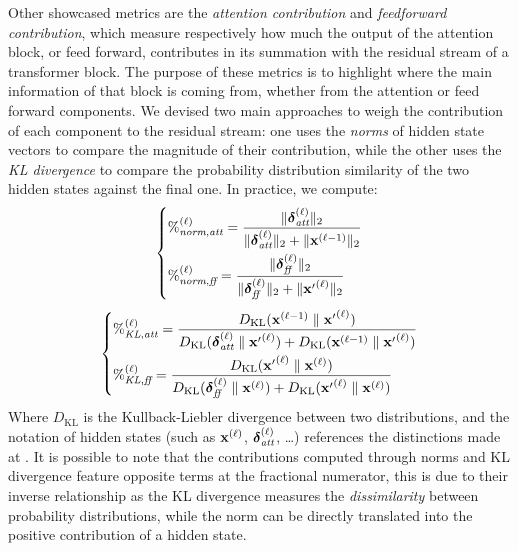 Other showcased metrics are the \emph{attention contribution} and \emph{feedforward contribution}, which measure respectively how much the output of the attention block, or feed forward, contributes in its summation with the residual stream of a transformer block.
The purpose of these metrics is to highlight where the main information of that block is coming from, whether from the attention or feed forward components.
We devised two main approaches to weigh the contribution of each component to the residual stream: one uses the \emph{norms} of hidden state vectors to compare the magnitude of their contribution, while the other uses the \emph{KL divergence} to compare the probability distribution similarity of the two hidden states against the final one.
In practice, we compute:
\begin{equation}
    \left\{
    \begin{aligned}
        &{\%}^{(\ell)}_{\textit{norm},\textit{att}} = \frac{\|\bm{\mathbf{\delta}}_\textit{att}^{(\ell)}\|_2}{\|\bm{\mathbf{\delta}}_\textit{att}^{(\ell)}\|_2 + \|\bm{\mathbf{x}}^{(\ell-1)}\|_2} \\
        &{\%}^{(\ell)}_{\textit{norm},\textit{ff}} = \frac{\|\bm{\mathbf{\delta}}_\textit{ff}^{(\ell)}\|_2}{\|\bm{\mathbf{\delta}}_\textit{ff}^{(\ell)}\|_2 + \|{\bm{\mathbf{x}}'}^{(\ell)}\|_2} \label{eq:method_intravisto_norm-contrib}
    \end{aligned}
    \right.
\end{equation}
\begin{equation}
    \left\{
    \begin{aligned}
        &{\%}^{(\ell)}_{\textit{KL},\textit{att}} = \frac{D_{\text{KL}}(\bm{\mathbf{x}}^{(\ell-1)} \parallel {\bm{\mathbf{x}}'}^{(\ell)})}{D_{\text{KL}}(\bm{\mathbf{\delta}}_\textit{att}^{(\ell)} \parallel {\bm{\mathbf{x}}'}^{(\ell)}) + D_{\text{KL}}(\bm{\mathbf{x}}^{(\ell-1)} \parallel {\bm{\mathbf{x}}'}^{(\ell)})} \\
        &{\%}^{(\ell)}_{\textit{KL},\textit{ff}} = \frac{D_{\text{KL}}({\bm{\mathbf{x}}'}^{(\ell)} \parallel \bm{\mathbf{x}}^{(\ell)})}{D_{\text{KL}}(\bm{\mathbf{\delta}}_\textit{ff}^{(\ell)} \parallel \bm{\mathbf{x}}^{(\ell)}) + D_{\text{KL}}({\bm{\mathbf{x}}'}^{(\ell)} \parallel \bm{\mathbf{x}}^{(\ell)})} \label{eq:method_intravisto_kl-contrib}
    \end{aligned}
    \right.
\end{equation}
Where $D_{\text{KL}}$ is the Kullback-Liebler divergence between two distributions, and the notation of hidden states (such as $\bm{\mathbf{x}}^{(\ell)}$, $\bm{\mathbf{\delta}}_\textit{att}^{(\ell)}$, \ldots) references the distinctions made at .
It is possible to note that the contributions computed through norms and KL divergence feature opposite terms at the fractional numerator, this is due to their inverse relationship as the KL divergence measures the \emph{dissimilarity} between probability distributions, while the norm can be directly translated into the positive contribution of a hidden state. 

